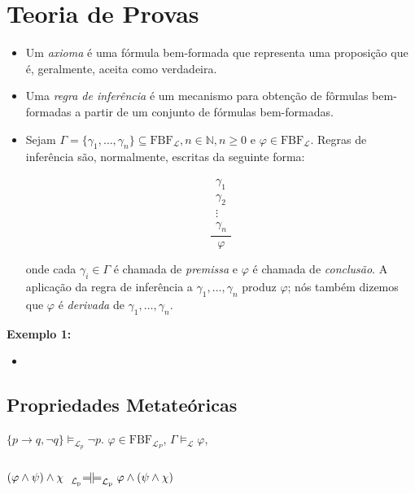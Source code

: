 \section{Teoria de Provas}

    \begin{itemize}[left=0.5cm, align=left, nosep]
        \item Um \textit{axioma} é uma fórmula bem-formada que representa uma proposição que é, geralmente, aceita como verdadeira. 
        \item Uma \textit{regra de inferência} é um mecanismo para obtenção de fôrmulas bem-formadas a partir de um conjunto de fórmulas bem-formadas.
        \item Sejam $\Gamma = \{ \gamma_1, \ldots, \gamma_n \} \subseteq \text{FBF}_{\mathcal{L}}, n \in \mathbb{N}, n \geq 0$ e $\varphi \in \text{FBF}_{\mathcal{L}}$.
        Regras de inferência são, normalmente, escritas da seguinte forma:
        
        \[
            \frac{
            \begin{array}{c}
            \gamma_1 \\
            \gamma_2 \\
            \vdots \\
            \gamma_n
            \end{array}
            }{\varphi}
        \]
        
        onde cada $\gamma_i \in \Gamma$ é chamada de \textit{premissa} e $\varphi$ é chamada de \textit{conclusão}. A aplicação da regra de inferência
        a $\gamma_1, \ldots, \gamma_n$ produz $\varphi$; nós também dizemos que $\varphi$ é \textit{derivada} de $\gamma_1, \ldots, \gamma_n$.    
    
    \end{itemize}

    \textbf{Exemplo 1:} 

    \begin{itemize}[left=0.5cm, nosep, label=$\hookrightarrow$]
        \item
    \end{itemize}

    \subsection{Propriedades Metateóricas} 
        
    $\{ p \to q, \neg q \} \models_{\mathcal{L}_p} \neg p$.
$\varphi \in \text{FBF}_{\mathcal{L}_P}$,
$\Gamma \models_{\mathcal{L}} \varphi$,
        \subsubsection*{}
$(\varphi \land \psi) \land \chi \Lpbimodels \varphi \land (\psi \land \chi)$

